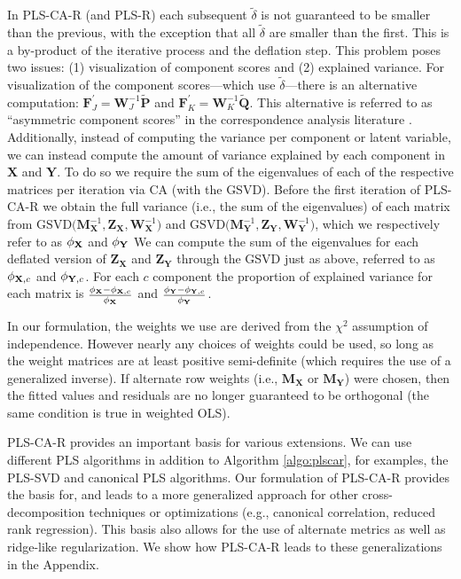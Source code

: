 \documentclass[12pt]{article}
\begin{document}
In PLS-CA-R (and PLS-R) each subsequent \(\widetilde{\delta}\) is not
guaranteed to be smaller than the previous, with the exception that all
\(\widetilde \delta\) are smaller than the first. This is a by-product
of the iterative process and the deflation step. This problem poses two
issues: (1) visualization of component scores and (2) explained
variance. For visualization of the component scores---which use
\(\widetilde \delta\)---there is an alternative computation:
\({\mathbf F}^{'}_{J} = {\mathbf W}_{J}^{-1}\widetilde{\mathbf P}\) and
\({\mathbf F}^{'}_{K} = {\mathbf W}_{K}^{-1}\widetilde{\mathbf Q}\).
This alternative is referred to as ``asymmetric component scores'' in
the correspondence analysis literature
\citep{abdi2014correspondence, greenacre1993biplots}. Additionally,
instead of computing the variance per component or latent variable, we
can instead compute the amount of variance explained by each component
in \(\mathbf X\) and \(\mathbf Y\). To do so we require the sum of the
eigenvalues of each of the respective matrices per iteration via CA
(with the GSVD). Before the first iteration of PLS-CA-R we obtain the
full variance (i.e., the sum of the eigenvalues) of each matrix from
\(\mathrm{GSVD(} {\mathbf M}^{-1}_{\mathbf X}, {\mathbf Z}_{\mathbf X}, {\mathbf W}^{-1}_{\mathbf X} \mathrm{)}\)
and
\(\mathrm{GSVD(} {\mathbf M}^{-1}_{\mathbf Y}, {\mathbf Z}_{\mathbf Y}, {\mathbf W}^{-1}_{\mathbf Y} \mathrm{)}\),
which we respectively refer to as \({\phi}_{\bf X}\) and
\({\phi}_{\bf Y}\) We can compute the sum of the eigenvalues for each
deflated version of \({\mathbf Z}_{\mathbf X}\) and
\({\mathbf Z}_{\mathbf Y}\) through the GSVD just as above, referred to
as \({\phi}_{{\bf X},c}\) and \({\phi}_{{\bf Y},c}\). For each \(c\)
component the proportion of explained variance for each matrix is
\(\frac{{\phi}_{\bf X} - {\phi}_{{\bf X},c}}{{\phi}_{\bf X}}\) and
\(\frac{{\phi}_{\bf Y} - {\phi}_{{\bf Y},c}}{{\phi}_{\bf Y}}\).

In our formulation, the weights we use are derived from the \(\chi^2\)
assumption of independence. However nearly any choices of weights could
be used, so long as the weight matrices are at least positive
semi-definite (which requires the use of a generalized inverse). If
alternate row weights (i.e., \({\mathbf M}_{\mathbf X}\) or
\({\mathbf M}_{\mathbf Y}\)) were chosen, then the fitted values and
residuals are no longer guaranteed to be orthogonal (the same condition
is true in weighted OLS).

PLS-CA-R provides an important basis for various extensions. We can use
different PLS algorithms in addition to Algorithm \ref{algo:plscar}, for
examples, the PLS-SVD and canonical PLS algorithms. Our formulation of
PLS-CA-R provides the basis for, and leads to a more generalized
approach for other cross-decomposition techniques or optimizations
(e.g., canonical correlation, reduced rank regression). This basis also
allows for the use of alternate metrics as well as ridge-like
regularization. We show how PLS-CA-R leads to these generalizations in
the Appendix.
\end{document}

